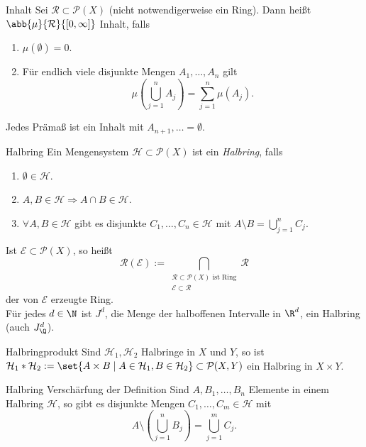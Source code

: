 \begin{karte}{Inhalt}
	Sei \( \mathcal{R} \subset \mathcal{P}(X) \) (nicht notwendigerweise ein Ring). Dann heißt 
	\( \abb{\mu}{\mathcal{R}}{[0,\infty]} \) Inhalt, falls 
	\begin{enumerate}
		\item \( \mu(\emptyset) = 0 \).
		\item Für endlich viele disjunkte Mengen \( A_1 ,\ldots, A_n \) gilt 
		\[ \mu \left( \bigcup_{j=1}^n A_j \right) = \sum_{j=1}^n \mu(A_j). \]
	\end{enumerate}
	Jedes Prämaß ist ein Inhalt mit \( A_{n+1}, \ldots = \emptyset \).
\end{karte}

\begin{karte}{Halbring}
	Ein Mengensystem \( \mathcal{H} \subset \mathcal{P}(X) \) ist ein \textit{Halbring}, falls 
	\begin{enumerate}
		\item \( \emptyset \in \mathcal{H} \).
		\item \( A, B \in \mathcal{H} \Rightarrow A \cap B \in \mathcal{H} \).
		\item \( \forall A,B\in \mathcal{H} \) gibt es disjunkte \( C_1,\ldots, C_n \in \mathcal{H} \) 
		mit \( A \setminus B = \bigcup_{j=1}^n C_j \).
	\end{enumerate}
	Ist \( \mathcal{E} \subset \mathcal{P}(X) \), so heißt 
	\[ \mathcal{R}(\mathcal{E}) 
	:= \bigcap_{\substack{\mathcal{R} \subset \mathcal{P}(X) \text{ ist Ring}\\ \mathcal{E} \subset \mathcal{R}}} \mathcal{R} \]
	der von \( \mathcal{E} \) erzeugte Ring.\\
	Für jedes \( d\in \N \) ist \(J^d\), die Menge der halboffenen Intervalle in \(\R^d\), ein Halbring (auch \(J_\Q^d\)). 
\end{karte}

\begin{karte}{Halbringprodukt}
	Sind \( \mathcal{H}_1, \mathcal{H}_2 \) Halbringe in \(X\) und \(Y\), so ist \( \mathcal{H}_1 * \mathcal{H}_2 := \set{ A\times B \;|\; A\in \mathcal{H}_1, B\in \mathcal{H}_2 } \subset \mathcal{P}(X,Y) \) ein Halbring in \(X\times Y\).
\end{karte}

\begin{karte}{Halbring Verschärfung der Definition}
	Sind \( A, B_1, \ldots, B_n \) Elemente in einem Halbring \( \mathcal{H} \), 
	so gibt es disjunkte Mengen \( C_1, \ldots, C_m \in \mathcal{H} \) mit 
	\[ A \setminus \left( \bigcup_{j=1}^n B_j \right) = \bigcup_{j=1}^m C_j. \]
\end{karte}

